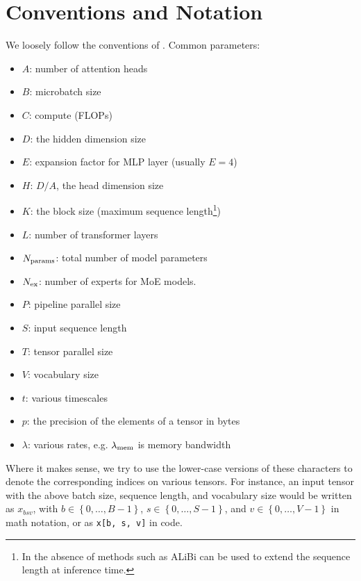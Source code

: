 \appendix
\section{Conventions and Notation\label{app_conventions}}


We loosely follow the conventions of \cite{korthikanti2022reducing}.  Common parameters:
\begin{itemize}
	\item $ A $: number of attention heads
	\item $ B $: microbatch size
	\item $ C $: compute (FLOPs)
	\item $ D $: the hidden dimension size
	\item $ E $: expansion factor for MLP layer (usually $ E=4 $)
	\item $ H $: $ D/A $, the head dimension size
	\item $ K $: the block size (maximum sequence length\footnote{In the absence of methods such as         ALiBi \cite{ALiBi}  can be used to extend the sequence length at inference time.})
	\item $ L $: number of transformer layers
	\item $ N _{ {\rm params}  } $: total number of model parameters
	\item $ N _{ {\rm ex}  } $: number of experts for MoE models.
	\item $ P $: pipeline parallel size
	\item $ S $: input sequence length
	\item $ T $: tensor parallel size
	\item $ V $: vocabulary size
	\item $ t $: various timescales
	\item $ p $: the precision of the elements of a tensor in bytes
	\item $ \lambda  $: various rates, e.g. $ \lambda _{ {\rm mem}  } $ is memory bandwidth
\end{itemize}
Where it makes sense, we try to use the lower-case versions of these characters to denote the
corresponding indices on various tensors. For instance, an input tensor with the above batch size,
sequence length, and vocabulary size would be written as $ x _{ bsv } $, with $ b \in \left \{ 0,
	\ldots, B - 1 \right \} $, $ s \in \left \{ 0, \ldots, S - 1\right \} $, and $  v \in \left \{ 0,
	\ldots, V -1\right \}$ in math notation, or as \texttt{x[b, s, v]} in code.


